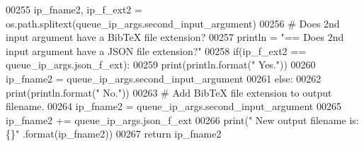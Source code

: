 \begin{DoxyCode}
00255         ip\_fname2, ip\_f\_ext2 = os.path.splitext(queue\_ip\_args.second\_input\_argument)
00256         \textcolor{comment}{#   Does 2nd input argument have a BibTeX file extension?}
00257         println = \textcolor{stringliteral}{"==   Does 2nd input argument have a JSON file extension?"}
00258         if(ip\_f\_ext2 == queue\_ip\_args.json\_f\_ext):
00259             print(println.format(\textcolor{stringliteral}{"  Yes."}))
00260             ip\_fname2 = queue\_ip\_args.second\_input\_argument
00261         \textcolor{keywordflow}{else}:
00262             print(println.format(\textcolor{stringliteral}{"  No."}))
00263             \textcolor{comment}{#   Add BibTeX file extension to output filename.}
00264             ip\_fname2 = queue\_ip\_args.second\_input\_argument
00265             ip\_fname2 += queue\_ip\_args.json\_f\_ext
00266             print(\textcolor{stringliteral}{" New output filename is: \{\}"} .format(ip\_fname2))
00267         \textcolor{keywordflow}{return} ip\_fname2
\end{DoxyCode}
